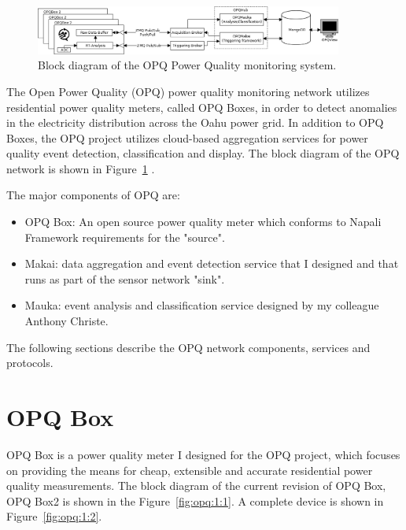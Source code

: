 \begin{figure}[h]
  \begin{center}
  \includegraphics[width=0.9\textwidth]{img/system-diagram.png}
  \end{center}
  \caption{Block diagram of the OPQ Power Quality monitoring system.}
  \label{fig:opq:1}
\end{figure}

The Open Power Quality (OPQ) power quality monitoring network utilizes residential power quality meters, called OPQ Boxes, in order to detect anomalies in the electricity distribution across the Oahu power grid.
In addition to OPQ Boxes, the OPQ project utilizes cloud-based aggregation services for power quality event detection, classification and display.
The block diagram of the OPQ network is shown in Figure~\ref{fig:opq:1} .

The major components of OPQ are:
\begin {itemize}
	\item OPQ Box: An open source power quality meter which conforms to Napali Framework requirements for the "source".
	\item Makai: data aggregation and event detection service that I designed and that runs as part of the sensor network "sink".
	\item Mauka: event analysis and classification service designed by my colleague Anthony Christe.
\end {itemize}

The following sections describe the OPQ network components, services and protocols.

\section{OPQ Box}\label{sec:opq-box}

OPQ Box is a power quality meter I designed for the OPQ project, which focuses on providing the means for cheap, extensible and accurate residential power quality measurements.
The block diagram of the current revision of OPQ Box, OPQ Box2 is shown in the Figure~\ref{fig:opq:1:1}.
A complete device is shown in Figure~\ref{fig:opq:1:2}.

